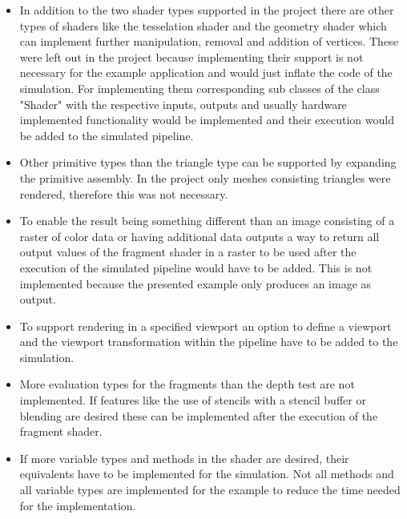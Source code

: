 \begin{itemize}
\item In addition to the two shader types supported in the project there are other types of shaders like the tesselation shader and the geometry shader which can implement further manipulation, removal and addition of vertices. These were left out in the project because implementing their support is not necessary for the example application and would just inflate the code of the simulation. For implementing them corresponding sub classes of the class "Shader" with the respective inputs, outputs and usually hardware implemented functionality would be implemented and their execution would be added to the simulated pipeline.
\item Other primitive types than the triangle type can be supported by expanding the primitive assembly. In the project only meshes consisting triangles were rendered, therefore this was not necessary.
\item To enable the result being something different than an image consisting of a raster of color data or having additional data outputs a way to return all output values of the fragment shader in a raster to be used after the execution of the simulated pipeline would have to be added. This is not implemented because the presented example only produces an image as output.
\item To support rendering in a specified viewport an option to define a viewport and the viewport transformation within the pipeline have to be added to the simulation.
\item More evaluation types for the fragments than the depth test are not implemented. If features like the use of stencils with a stencil buffer or blending are desired these can be implemented after the execution of the fragment shader.
\item If more variable types and methods in the shader are desired, their equivalents have to be implemented for the simulation. Not all methods and all variable types are implemented for the example to reduce the time needed for the implementation.
\end{itemize}

